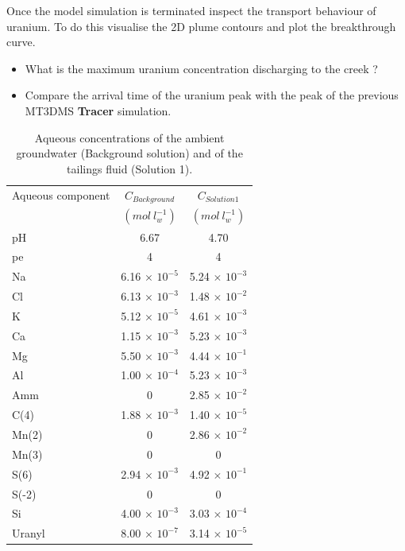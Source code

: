 Once the model simulation is terminated 
inspect the transport behaviour of uranium.
To do this visualise the 2D plume contours and 
plot the breakthrough curve.

\begin{itemize}
\item What is the maximum uranium concentration discharging to the creek ?
\item Compare the arrival time of the uranium peak with the peak of 
the previous MT3DMS {\color{blue}\textbf{Tracer}} simulation.        
\end{itemize}


\begin{table}[hb]
\caption{Aqueous concentrations of the ambient groundwater (Background solution)
and of the tailings fluid (Solution 1).}
\begin{center}
\begin{tabular}{l c c}
\hline
 Aqueous component       & $C_{Background}$         & $C_{Solution 1}$      \\
                         & $(mol\ l^{-1}_w)$        & $(mol\ l^{-1}_w)$      \\ \hline
 pH                      &   6.67                   &  4.70            \\
 pe                      &   4                      &  4            \\
 Na                      & 6.16 $\times$ $10^{-5}$  & 5.24 $\times$ $10^{-3}$ \\ 
 Cl                      & 6.13 $\times$ $10^{-3}$  & 1.48 $\times$ $10^{-2}$ \\
 K                       & 5.12 $\times$ $10^{-5}$  & 4.61 $\times$ $10^{-3}$ \\
 Ca                      & 1.15 $\times$ $10^{-3}$  & 5.23 $\times$ $10^{-3}$ \\
 Mg                      & 5.50 $\times$ $10^{-3}$  & 4.44 $\times$ $10^{-1}$ \\
 Al                      & 1.00 $\times$ $10^{-4}$  & 5.23 $\times$ $10^{-3}$ \\
 Amm                     & 0                        & 2.85 $\times$ $10^{-2}$ \\
 C(4)                    & 1.88 $\times$ $10^{-3}$  & 1.40 $\times$ $10^{-5}$ \\
 Mn(2)                   & 0                        & 2.86 $\times$ $10^{-2}$ \\
 Mn(3)                   & 0                        & 0 \\
 S(6)                    & 2.94 $\times$ $10^{-3}$  & 4.92 $\times$ $10^{-1}$ \\
 S(-2)                   & 0                        & 0 \\
 Si                      & 4.00 $\times$ $10^{-3}$  & 3.03 $\times$ $10^{-4}$ \\
 Uranyl                  & 8.00 $\times$ $10^{-7}$  & 3.14 $\times$ $10^{-5}$ \\ \hline
\end{tabular}
\label{ex_dd_u}
\end{center}
\end{table}


